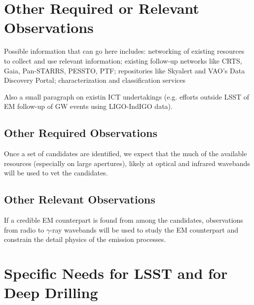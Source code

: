 \documentclass [11pt]{article}
\begin{document}
\section{Other Required or Relevant Observations}

Possible information that can go here includes:
networking of existing resources to collect and use relevant information; 
existing follow-up networks like CRTS, Gaia, Pan-STARRS, PESSTO, PTF; 
repositories like Skyalert and VAO's Data Discovery Portal; 
characterization and classification services

Also a small paragraph on existin ICT undertakings (e.g. efforts outside LSST of EM follow-up of GW events using LIGO-IndIGO data).


\subsection{Other Required Observations}

%
Once a set of candidates are identified, we expect that the much of the available resources (especially on large apertures), likely at optical and infrared wavebands will be used to vet the candidates.


\subsection{Other Relevant Observations}

If a credible EM counterpart is found from among the candidates, observations from radio to $\gamma$-ray wavebands will be used to study the EM counterpart and constrain the detail physics of the emission processes.


\section{Specific Needs for LSST and for Deep Drilling}
\end{document}

